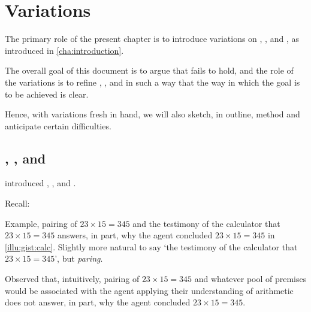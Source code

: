 \chapter{Variations}
\label{cha:var}

\begin{note}
  The primary role of the present chapter is to introduce variations on \qWhy{}, \qHow{}, and \issueInclusion{}, as introduced in \autoref{cha:introduction}.

  The overall goal of this document is to argue that \issueInclusion{} fails to hold, and the role of the variations is to refine \qWhy{}, \qHow{}, and \issueInclusion{} in such a way that the way in which the goal is to be achieved is clear.

  Hence, with variations fresh in hand, we will also sketch, in outline, method and anticipate certain difficulties.
\end{note}

\section{\qWhy{}, \qHow{}, and \issueInclusion{}}
\label{cha:var:sec:q-no-v}

\begin{note}
   introduced \qWhy{}, \qHow{}, and \issueInclusion{}.

  Recall:

  \begin{quote}%
   \vspace{-1.5\baselineskip}%
    \questionWhyBasic*
  \end{quote}

  \begin{quote}%
   \vspace{-1.5\baselineskip}%
    \questionHowBasic*
  \end{quote}

  \begin{quote}%
   \vspace{-1.5\baselineskip}%
    \issueInclusionFirst*
  \end{quote}
\end{note}

\begin{note}
    Example, pairing of \(23 \times 15 = 345\) and the testimony of the calculator that \(23 \times 15 = 345\) answers, in part, why the agent concluded \(23 \times 15 = 345\) in \autoref{illu:gist:calc}.
    Slightly more natural to say `the testimony of the calculator that \(23 \times 15 = 345\)', but \emph{paring}.

    Observed that, intuitively, pairing of \(23 \times 15 = 345\) and whatever pool of premises would be associated with the agent applying their understanding of arithmetic does not answer, in part, why the agent concluded \(23 \times 15 = 345\).
\end{note}

